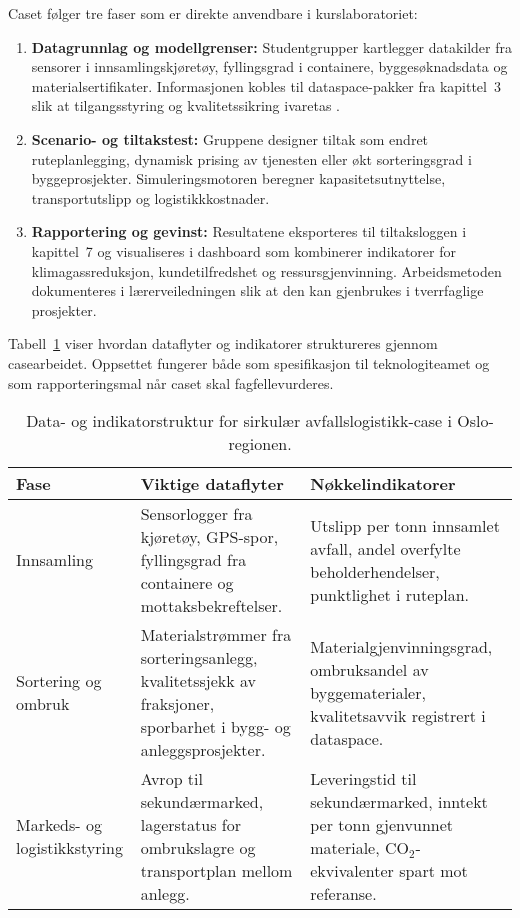 Caset følger tre faser som er direkte anvendbare i kurslaboratoriet:
\begin{enumerate}
    \item \textbf{Datagrunnlag og modellgrenser:} Studentgrupper kartlegger datakilder fra sensorer i innsamlingskjøretøy, fyllingsgrad i containere, byggesøknadsdata og materialsertifikater. Informasjonen kobles til dataspace-pakker fra kapittel~3 slik at tilgangsstyring og kvalitetssikring ivaretas \citep{norsus2022materialflyt}.
    \item \textbf{Scenario- og tiltakstest:} Gruppene designer tiltak som endret ruteplanlegging, dynamisk prising av tjenesten eller økt sorteringsgrad i byggeprosjekter. Simuleringsmotoren beregner kapasitetsutnyttelse, transportutslipp og logistikkkostnader.
    \item \textbf{Rapportering og gevinst:} Resultatene eksporteres til tiltaksloggen i kapittel~7 og visualiseres i dashboard som kombinerer indikatorer for klimagassreduksjon, kundetilfredshet og ressursgjenvinning. Arbeidsmetoden dokumenteres i lærerveiledningen slik at den kan gjenbrukes i tverrfaglige prosjekter.
\end{enumerate}

Tabell~\ref{tab:kap04-avfall-simulering} viser hvordan dataflyter og indikatorer struktureres gjennom casearbeidet. Oppsettet fungerer både som spesifikasjon til teknologiteamet og som rapporteringsmal når caset skal fagfellevurderes.

\begin{table}[htbp]
    \centering
    \begin{tabular}{p{}p{}p{}}
        \toprule
        \textbf{Fase} & \textbf{Viktige dataflyter} & \textbf{Nøkkelindikatorer}\\
        \midrule
        Innsamling & Sensorlogger fra kjøretøy, GPS-spor, fyllingsgrad fra containere og mottaksbekreftelser. & Utslipp per tonn innsamlet avfall, andel overfylte beholderhendelser, punktlighet i ruteplan.\\
        Sortering og ombruk & Materialstrømmer fra sorteringsanlegg, kvalitetssjekk av fraksjoner, sporbarhet i bygg- og anleggsprosjekter. & Materialgjenvinningsgrad, ombruksandel av byggematerialer, kvalitetsavvik registrert i dataspace.\\
        Markeds- og logistikkstyring & Avrop til sekundærmarked, lagerstatus for ombrukslagre og transportplan mellom anlegg. & Leveringstid til sekundærmarked, inntekt per tonn gjenvunnet materiale, CO$_2$-ekvivalenter spart mot referanse.\\
        \bottomrule
    \end{tabular}
    \caption{Data- og indikatorstruktur for sirkulær avfallslogistikk-case i Oslo-regionen.}
    \label{tab:kap04-avfall-simulering}
\end{table}

